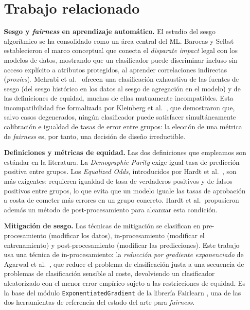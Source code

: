 \documentclass[11pt,a4paper]{article}
\begin{document}
\section{Trabajo relacionado}
\label{sec:related}

\textbf{Sesgo y \textit{fairness} en aprendizaje automático.} El estudio del sesgo algorítmico se
ha consolidado como un área central del ML. Barocas y Selbst \cite{barocas2016} establecieron el
marco conceptual que conecta el \textit{disparate impact} legal con los modelos de datos, mostrando
que un clasificador puede discriminar incluso sin acceso explícito a atributos protegidos, al
aprender correlaciones indirectas (\textit{proxies}). Mehrabi et al.\ \cite{mehrabi2021} ofrecen
una clasificación exhaustiva de las fuentes de sesgo (del sesgo histórico en los datos al sesgo de
agregación en el modelo) y de las definiciones de equidad, muchas de ellas mutuamente
incompatibles. Esta incompatibilidad fue formalizada por Kleinberg et al.\ \cite{kleinberg2017},
que demostraron que, salvo casos degenerados, ningún clasificador puede satisfacer simultáneamente
calibración e igualdad de tasas de error entre grupos: la elección de una métrica de \textit{fairness}
es, por tanto, una decisión de diseño irreductible.

\textbf{Definiciones y métricas de equidad.} Las dos definiciones que empleamos son estándar en
la literatura. La \textit{Demographic Parity} exige igual tasa de predicción positiva entre grupos.
Los \textit{Equalized Odds}, introducidos por Hardt et al.\ \cite{hardt2016}, son más exigentes:
requieren igualdad de tasa de verdaderos positivos y de falsos positivos entre grupos, lo que evita
que un modelo iguale las tasas de aprobación a costa de cometer más errores en un grupo concreto.
Hardt et al.\ propusieron además un método de post-procesamiento para alcanzar esta condición.

\textbf{Mitigación de sesgo.} Las técnicas de mitigación se clasifican en pre-procesamiento (modificar
los datos), in-procesamiento (modificar el entrenamiento) y post-procesamiento (modificar las
predicciones). Este trabajo usa una técnica de in-procesamiento: la \textit{reducción por gradiente
exponenciado} de Agarwal et al.\ \cite{agarwal2018}, que reduce el problema de clasificación justa
a una secuencia de problemas de clasificación sensible al coste, devolviendo un clasificador
aleatorizado con el menor error empírico sujeto a las restricciones de equidad. Es la base del
módulo \texttt{ExponentiatedGradient} de la librería Fairlearn \cite{bird2020}, una de las dos
herramientas de referencia del estado del arte para \textit{fairness}.
\end{document}
